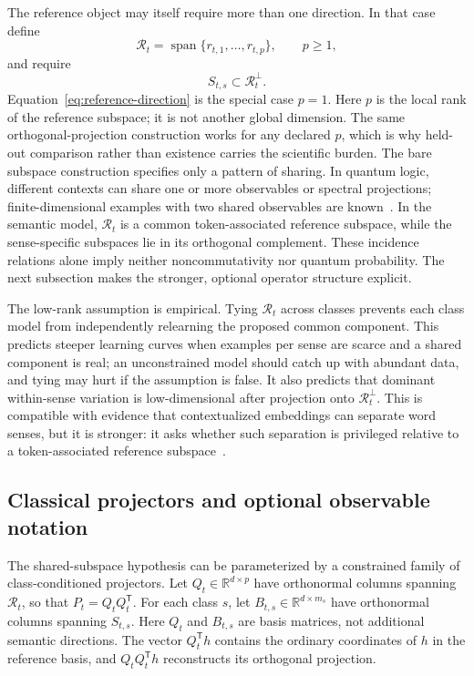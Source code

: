 \documentclass[
  aps,
  reprint,
  superscriptaddress,
  floatfix,
  nofootinbib,
  longbibliography
]{revtex4-2}
\newcommand{\R}{\mathbb{R}}
\newcommand{\T}{^{\mathsf{T}}}
\DeclareMathOperator{\spanop}{span}
\begin{document}
The reference object may itself require more than one direction. In that
case define
%
\begin{equation}
\label{eq:reference-subspace}
\mathcal R_t=
\spanop\{r_{t,1},\dots,r_{t,p}\},
\qquad p\ge1,
\end{equation}
%
and require
%
\begin{equation}
\label{eq:multi-sense-subspace}
S_{t,s}\subset\mathcal R_t^\perp .
\end{equation}
%
Equation~\eqref{eq:reference-direction} is the special case $p=1$.
Here $p$ is the local rank of the reference subspace; it is not another global
dimension.  The same orthogonal-projection construction works for any declared
$p$, which is why held-out comparison rather than existence carries the
scientific burden.
The bare subspace construction specifies only a pattern of sharing. In
quantum logic, different contexts can share one or more observables or
spectral projections; finite-dimensional examples with two shared
observables are known~\cite{svozil:040102}. In the semantic model,
$\mathcal R_t$ is a common token-associated reference subspace, while the
sense-specific subspaces lie in its orthogonal complement. These incidence
relations alone imply neither noncommutativity nor quantum probability. The
next subsection makes the stronger, optional operator structure explicit.

The low-rank assumption is empirical.  Tying $\mathcal R_t$ across classes
prevents each class model from independently relearning the proposed common
component.  This predicts steeper learning curves when examples per sense are
scarce and a shared component is real; an unconstrained model should catch up
with abundant data, and tying may hurt if the assumption is false.  It also predicts that dominant
within-sense variation is low-dimensional after projection onto
$\mathcal R_t^\perp$. This is compatible with evidence that contextualized
embeddings can separate word senses, but it is stronger: it asks whether
such separation is privileged relative to a token-associated reference
subspace~\cite{wiedemann2019does,scarlini2020ares}.

\subsection{Classical projectors and optional observable notation}
\label{sec:observables}

The shared-subspace hypothesis can be parameterized by a constrained family
of class-conditioned projectors.  Let $Q_t\in\R^{d\times p}$ have orthonormal columns
spanning $\mathcal R_t$, so that $P_t=Q_tQ_t\T$.  For each class $s$, let
$B_{t,s}\in\R^{d\times m_s}$ have orthonormal columns spanning $S_{t,s}$.
Here $Q_t$ and $B_{t,s}$ are basis matrices, not additional semantic
directions.  The vector $Q_t\T h$ contains the ordinary coordinates of $h$ in
the reference basis, and $Q_tQ_t\T h$ reconstructs its orthogonal projection.
\end{document}
